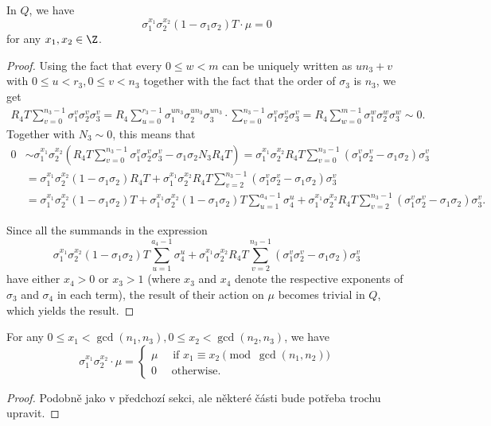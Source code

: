 \begin{lemma}\label{Tdiag4}
In $Q$, we have $$\sigma_1^{x_1}\sigma_2^{x_2}(1-\sigma_1\sigma_2)T\cdot \mu=0$$
for any $x_1,x_2\in\Z$.
\end{lemma}
\begin{proof}
Using the fact that every $0\leq w<m$ can be uniquely written as $un_3+v$ with $0\leq u<r_3, 0\leq v<n_3$ together with the fact that the order of $\sigma_3$ is $n_3$, we get 
\begin{align*}
R_4T\sum_{v=0}^{n_3-1}\sigma_1^{v}\sigma_2^{v}\sigma_3^{v}=R_4\sum_{u=0}^{r_3-1}\sigma_1^{un_3}\sigma_2^{un_3}\sigma_3^{un_3}\cdot \sum_{v=0}^{n_3-1}\sigma_1^{v}\sigma_2^{v}\sigma_3^{v}=R_4\sum_{w=0}^{m-1}\sigma_1^{w}\sigma_2^{w}\sigma_3^{w}\sim 0.
\end{align*}
Together with $N_3\sim 0$, this means that 
\begin{align*}
0&\sim \sigma_1^{x_1}\sigma_2^{x_2}\left(R_4T \sum_{v=0}^{n_3-1}\sigma_1^{v}\sigma_2^{v}\sigma_3^{v}-\sigma_1\sigma_2N_3R_4T\right)=\sigma_1^{x_1}\sigma_2^{x_2}R_4T\sum_{v=0}^{n_3-1}\left(\sigma_1^{v}\sigma_2^{v}-\sigma_1\sigma_2\right)\sigma_3^{v}\\
&=\sigma_1^{x_1}\sigma_2^{x_2}(1-\sigma_1\sigma_2)R_4T+\sigma_1^{x_1}\sigma_2^{x_2}R_4T\sum_{v=2}^{n_3-1}\left(\sigma_1^{v}\sigma_2^{v}-\sigma_1\sigma_2\right)\sigma_3^{v}\\
&=\sigma_1^{x_1}\sigma_2^{x_2}(1-\sigma_1\sigma_2)T\!+\!
\sigma_1^{x_1}\sigma_2^{x_2}(1\!-\!\sigma_1\sigma_2)T\sum_{u=1}^{a_4-1}\sigma_4^u\!+\!\sigma_1^{x_1}\sigma_2^{x_2}R_4T\sum_{v=2}^{n_3-1}\left(\sigma_1^{v}\sigma_2^{v}\!-\!\sigma_1\sigma_2\right)\sigma_3^{v}.
\end{align*}

Since all the summands in the expression $$\sigma_1^{x_1}\sigma_2^{x_2}(1-\sigma_1\sigma_2)T\sum_{u=1}^{a_4-1}\sigma_4^u+\sigma_1^{x_1}\sigma_2^{x_2}R_4T\sum_{v=2}^{n_3-1}\left(\sigma_1^{v}\sigma_2^{v}-\sigma_1\sigma_2\right)\sigma_3^{v}$$
have either $x_4>0$ or $x_3>1$ (where $x_3$ and $x_4$ denote the respective exponents of $\sigma_3$ and $\sigma_4$ in each term), the result of their action on $\mu$ becomes trivial in $Q$, which yields the result.
\end{proof}


\begin{lemma}\label{M04}
For any $0\leq x_1<\gcd(n_1,n_3), 0\leq x_2<\gcd(n_2,n_3)$, we have $$\sigma_1^{x_1}\sigma_2^{x_2}\cdot \mu=\begin{cases}
\mu \quad \text{ if } x_1\equiv x_2 \pmod{\gcd(n_1,n_2)}\\
0 \quad \text{ otherwise}.
\end{cases}$$
\end{lemma}
\begin{proof}
Podobně jako v předchozí sekci, ale některé části bude potřeba trochu upravit.
\end{proof}

